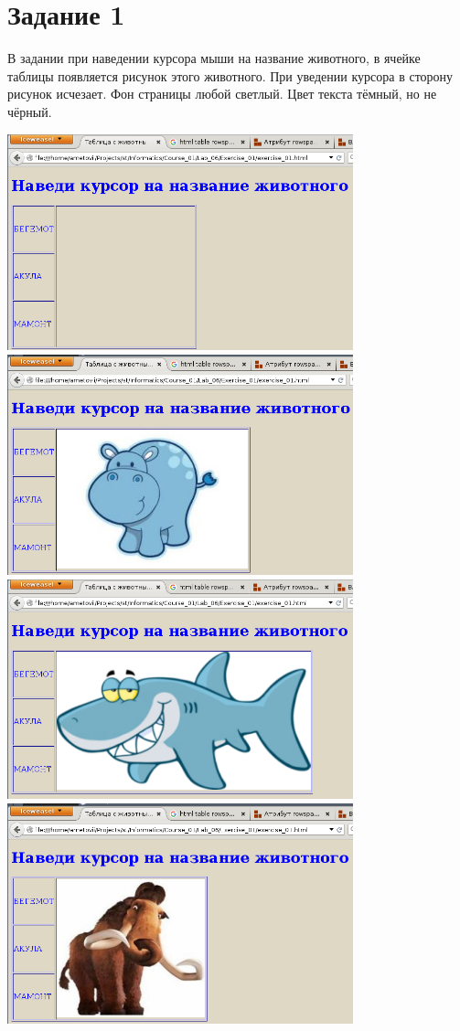 \section{Задание 1}

В задании при наведении курсора мыши на название животного, в ячейке таблицы появляется рисунок этого животного. При уведении курсора в сторону рисунок исчезает. Фон страницы любой светлый. Цвет текста тёмный, но не чёрный.

\begin{center}
  \includegraphics[width=10cm]{img/Exercise_01/01.png}
  \includegraphics[width=10cm]{img/Exercise_01/02.png}
  \includegraphics[width=10cm]{img/Exercise_01/03.png}
  \includegraphics[width=10cm]{img/Exercise_01/04.png}
\end{center}

